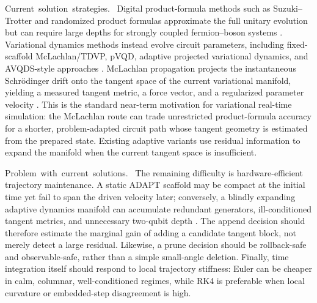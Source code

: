 \documentclass[
  reprint,
  amsmath,
  amssymb,
  aps,
  pra,
  nofootinbib,
  superscriptaddress,
  floatfix
]{revtex4-2}
\newcommand{\placeholder}[1]{\textcolor{red!70!black}{\ifmmode\left[#1\right]\else\textsf{[#1]}\fi}}
\newcommand{\tentative}[1]{\textcolor{red!70!black}{#1}}
\newcommand{\structlabel}[1]{\noindent\mbox{\tentative{#1.}}~}
\begin{document}
\structlabel{Current solution strategies}
Digital product-formula methods such as Suzuki--Trotter and randomized product formulas approximate the full unitary evolution but can require large depths for strongly coupled fermion--boson systems \cite{Suzuki1985,Suzuki1990,ChildsSu2019ProductFormula,ChildsOstranderSu2019RandomizedPF,Campbell2019QDRIFT,Macridin2018,Sawaya2020,Li2023}. %
Variational dynamics methods instead evolve circuit parameters, including fixed-scaffold McLachlan/TDVP, pVQD, adaptive projected variational dynamics, and AVQDS-style approaches \cite{LiBenjamin2017VQS,Yuan2019VQS,Endo2020GeneralProcesses,Benedetti2021TimeEvolution,Barison2021,Yao2021,Linteau2024,Zhang2025}. %
McLachlan propagation projects the instantaneous Schrödinger drift onto the tangent space of the current variational manifold, yielding a measured tangent metric, a force vector, and a regularized parameter velocity \cite{McLachlan1964,Yuan2019VQS,Barison2021}. %
This is the standard near-term motivation for variational real-time simulation: the McLachlan route can trade unrestricted product-formula accuracy for a shorter, problem-adapted circuit path whose tangent geometry is estimated from the prepared state.  Existing adaptive variants use residual information to expand the manifold when the current tangent space is insufficient.

\structlabel{Problem with current solutions}
The remaining difficulty is hardware-efficient trajectory maintenance.  A static ADAPT scaffold may be compact at the initial time yet fail to span the driven velocity later; conversely, a blindly expanding adaptive dynamics manifold can accumulate redundant generators, ill-conditioned tangent metrics, and unnecessary two-qubit depth \cite{Yao2021,Linteau2024,Zhang2025}. %
The append decision should therefore estimate the marginal gain of adding a candidate tangent block, not merely detect a large residual.  Likewise, a prune decision should be rollback-safe and observable-safe, rather than a simple small-angle deletion.  Finally, time integration itself should respond to local trajectory stiffness: Euler can be cheaper in calm, columnar, well-conditioned regimes, while RK4 is preferable when local curvature or embedded-step disagreement is high.
\end{document}
